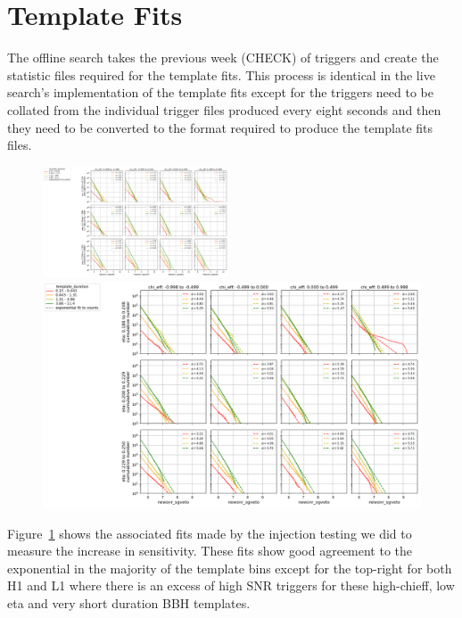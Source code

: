 \section{\label{live-template-fits}Template Fits}

The offline search takes the previous week (CHECK) of triggers and create the statistic files required for the template fits. This process is identical in the live search's implementation of the template fits except for the triggers need to be collated from the individual trigger files produced every eight seconds and then they need to be converted to the format required to produce the template fits files.
%
\begin{figure}
  \centering
  \begin{minipage}[t]{1.0\linewidth}
  \includegraphics[width=0.49\textwidth]{images/pycbclive/H1-template_fits.png}
  \hspace{0.01\linewidth}
  \includegraphics[width=0.49\linewidth]{images/pycbclive/L1-template_fits.png}
  \end{minipage}
  \caption{}
  \label{fig:pycbclive-fits}
\end{figure}
%
Figure~\ref{fig:pycbclive-fits} shows the associated fits made by the injection testing we did to measure the increase in sensitivity. These fits show good agreement to the exponential in the majority of the template bins except for the top-right for both H1 and L1 where there is an excess of high SNR triggers for these high-chieff, low eta and very short duration BBH templates.

\section{\label{Sensitivity Improvements}}

